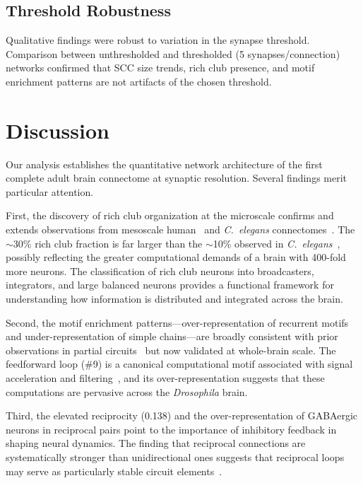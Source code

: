 \documentclass[11pt]{article}
\begin{document}
\subsection{Threshold Robustness}

Qualitative findings were robust to variation in the synapse threshold.  Comparison between unthresholded and thresholded (5 synapses/connection) networks confirmed that SCC size trends, rich club presence, and motif enrichment patterns are not artifacts of the chosen threshold.

\section{Discussion}

Our analysis establishes the quantitative network architecture of the first complete adult brain connectome at synaptic resolution.  Several findings merit particular attention.

First, the discovery of rich club organization at the microscale confirms and extends observations from mesoscale human~\citep{vandenHeuvel2011rich} and \emph{C.\ elegans} connectomes~\citep{towlson2013rich}.  The $\sim$30\% rich club fraction is far larger than the $\sim$10\% observed in \emph{C.\ elegans}~\citep{towlson2013rich}, possibly reflecting the greater computational demands of a brain with 400-fold more neurons.  The classification of rich club neurons into broadcasters, integrators, and large balanced neurons provides a functional framework for understanding how information is distributed and integrated across the brain.

Second, the motif enrichment patterns---over-representation of recurrent motifs and under-representation of simple chains---are broadly consistent with prior observations in partial circuits~\citep{milo2002network,sporns2004motifs} but now validated at whole-brain scale.  The feedforward loop (\#9) is a canonical computational motif associated with signal acceleration and filtering~\citep{alon2007network}, and its over-representation suggests that these computations are pervasive across the \emph{Drosophila} brain.

Third, the elevated reciprocity (0.138) and the over-representation of GABAergic neurons in reciprocal pairs point to the importance of inhibitory feedback in shaping neural dynamics.  The finding that reciprocal connections are systematically stronger than unidirectional ones suggests that reciprocal loops may serve as particularly stable circuit elements~\citep{rubinov2010complex}.
\end{document}
